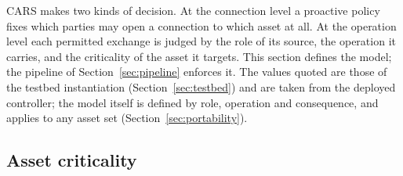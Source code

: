 CARS makes two kinds of decision. At the connection level a proactive policy fixes which parties may open a connection to which asset at all. At the operation level each permitted exchange is judged by the role of its source, the operation it carries, and the criticality of the asset it targets. This section defines the model; the pipeline of Section~\ref{sec:pipeline} enforces it. The values quoted are those of the testbed instantiation (Section~\ref{sec:testbed}) and are taken from the deployed controller; the model itself is defined by role, operation and consequence, and applies to any asset set (Section~\ref{sec:portability}).

\subsection{Asset criticality}

